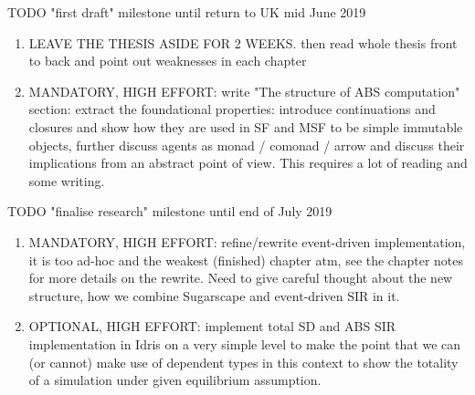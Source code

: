 \documentclass[oneside]{book}
\begin{document}

\bigskip

TODO "first draft" milestone until return to UK mid June 2019
\begin{enumerate}
	\item LEAVE THE THESIS ASIDE FOR 2 WEEKS. then read whole thesis front to back and point out weaknesses in each chapter

	\item MANDATORY, HIGH EFFORT: write "The structure of ABS computation" section: extract the foundational properties: introduce continuations and closures and show how they are used in SF and MSF to be simple immutable objects, further discuss agents as monad / comonad / arrow and discuss their implications from an abstract point of view. This requires a lot of reading and some writing.
\end{enumerate}

TODO "finalise research" milestone until end of July 2019
\begin{enumerate}
	\item MANDATORY, HIGH EFFORT: refine/rewrite event-driven implementation, it is too ad-hoc and the weakest (finished) chapter atm, see the chapter notes for more details on the rewrite. Need to give careful thought about the new structure, how we combine Sugarscape and event-driven SIR in it.

	\item OPTIONAL, HIGH EFFORT: implement total SD and ABS SIR implementation in Idris on a very simple level to make the point that we can (or cannot) make use of dependent types in this context to show the totality of a simulation under given equilibrium assumption.
\end{enumerate}
\end{document}
